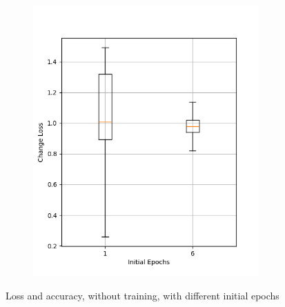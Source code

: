 \begin{figure}
\begin{subfigure}{0.5\textwidth}
        \includegraphics[width=0.95\textwidth]{plots/InitEpoch_NotTrained_loss.png}
    \end{subfigure}
    \caption{Loss and accuracy, without training, with different initial epochs}
    \label{fig:initial-epochs-notraining}
\end{figure}
